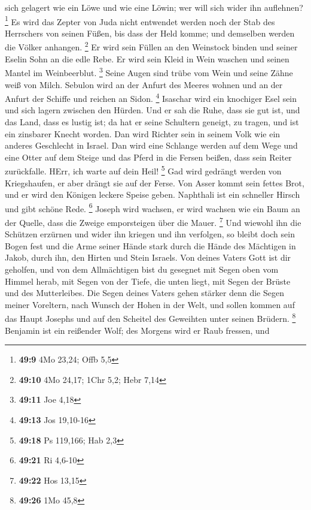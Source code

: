 sich gelagert wie ein Löwe und wie eine Löwin; wer will sich wider ihn
auflehnen? \footnote{\textbf{49:9} 4Mo 23,24; Offb 5,5}  Es
wird das Zepter von Juda nicht entwendet werden noch der Stab des
Herrschers von seinen Füßen, bis dass der Held komme; und demselben
werden die Völker anhangen. \footnote{\textbf{49:10} 4Mo 24,17; 1Chr
  5,2; Hebr 7,14}  Er wird sein Füllen an den Weinstock
binden und seiner Eselin Sohn an die edle Rebe. Er wird sein Kleid in
Wein waschen und seinen Mantel im Weinbeerblut. \footnote{\textbf{49:11}
  Joe 4,18}  Seine Augen sind trübe vom Wein und seine
Zähne weiß von Milch.  Sebulon wird an der Anfurt des
Meeres wohnen und an der Anfurt der Schiffe und reichen an Sidon.
\footnote{\textbf{49:13} Jos 19,10-16}  Isaschar wird ein
knochiger Esel sein und sich lagern zwischen den Hürden. 
Und er sah die Ruhe, dass sie gut ist, und das Land, dass es lustig ist;
da hat er seine Schultern geneigt, zu tragen, und ist ein zinsbarer
Knecht worden.  Dan wird Richter sein in seinem Volk wie
ein anderes Geschlecht in Israel.  Dan wird eine Schlange
werden auf dem Wege und eine Otter auf dem Steige und das Pferd in die
Fersen beißen, dass sein Reiter zurückfalle.  HErr, ich
warte auf dein Heil! \footnote{\textbf{49:18} Ps 119,166; Hab 2,3}
 Gad wird gedrängt werden von Kriegshaufen, er aber drängt
sie auf der Ferse.  Von Asser kommt sein fettes Brot, und
er wird den Königen leckere Speise geben.  Naphthali ist
ein schneller Hirsch und gibt schöne Rede. \footnote{\textbf{49:21} Ri
  4,6-10}  Joseph wird wachsen, er wird wachsen wie ein
Baum an der Quelle, dass die Zweige emporsteigen über die Mauer.
\footnote{\textbf{49:22} Hos 13,15}  Und wiewohl ihn die
Schützen erzürnen und wider ihn kriegen und ihn verfolgen, 
so bleibt doch sein Bogen fest und die Arme seiner Hände stark durch die
Hände des Mächtigen in Jakob, durch ihn, den Hirten und Stein Israels.
 Von deines Vaters Gott ist dir geholfen, und von dem
Allmächtigen bist du gesegnet mit Segen oben vom Himmel herab, mit Segen
von der Tiefe, die unten liegt, mit Segen der Brüste und des
Mutterleibes.  Die Segen deines Vaters gehen stärker denn
die Segen meiner Voreltern, nach Wunsch der Hohen in der Welt, und
sollen kommen auf das Haupt Josephs und auf den Scheitel des Geweihten
unter seinen Brüdern. \footnote{\textbf{49:26} 1Mo 45,8} 
Benjamin ist ein reißender Wolf; des Morgens wird er Raub fressen, und
